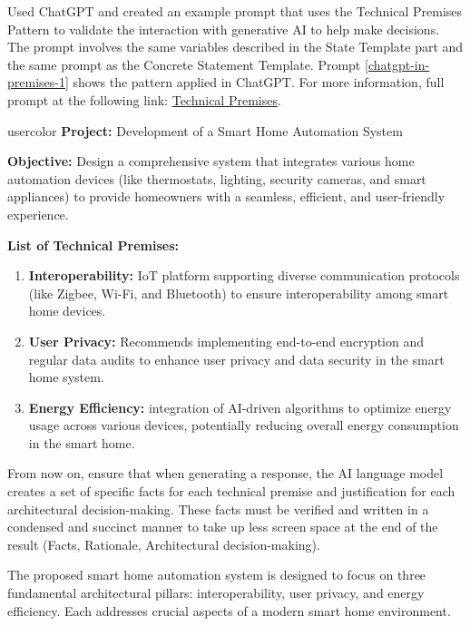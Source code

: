  Used ChatGPT and created an example prompt that uses the Technical Premises Pattern to validate the interaction with generative AI to help make decisions. The prompt involves the same variables described in the State Template part and the same prompt as the Concrete Statement Template. Prompt \ref{chatgpt-in-premises-1} shows the pattern applied in ChatGPT. For more information, full prompt at the following link: \href{https://chat.openai.com/share/b0a0651d-2e1f-4be3-9995-1d4babdd1da4}{Technical Premises}.

\begin{chatin}{usercolor}{}
\noindent
\textbf{Project:} Development of a Smart Home Automation System

\noindent
\textbf{Objective:} Design a comprehensive system that integrates various home automation devices (like thermostats, lighting, security cameras, and smart appliances) to provide homeowners with a seamless, efficient, and user-friendly experience.

\noindent \textbf{List of Technical Premises:}
\begin{enumerate}
    \item \textbf{Interoperability:}  IoT platform supporting diverse communication protocols (like Zigbee, Wi-Fi, and Bluetooth) to ensure interoperability among smart home devices.    
    \item \textbf{User Privacy:}  Recommends implementing end-to-end encryption and regular data audits to enhance user privacy and data security in the smart home system.    
    \item \textbf{Energy Efficiency:}  integration of AI-driven algorithms to optimize energy usage across various devices, potentially reducing overall energy consumption in the smart home.    
\end{enumerate}
From now on, ensure that when generating a response, the AI language model creates a set of specific facts for each technical premise and justification for each architectural decision-making. These facts must be verified and written in a condensed and succinct manner to take up less screen space at the end of the result (Facts, Rationale, Architectural decision-making).
\end{chatin}

The proposed smart home automation system is designed to focus on three fundamental architectural pillars: interoperability, user privacy, and energy efficiency. Each addresses crucial aspects of a modern smart home environment.

